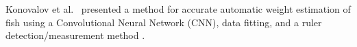 \documentclass[screen,review]{acmart}
\begin{document}
Konovalov et al.~\cite{Konovalov2019AutomaticWE} presented a method for
accurate automatic weight estimation of fish using a Convolutional Neural
Network (CNN), data fitting, and a ruler detection/measurement
method \cite{Konovalov2018AutomaticSO}.
\end{document}
